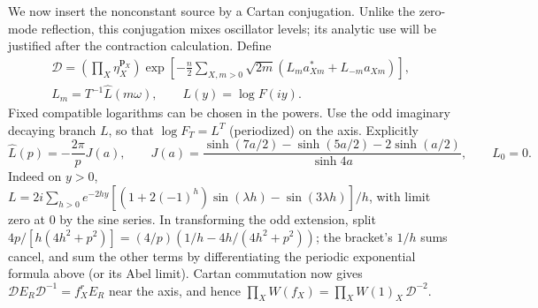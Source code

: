 We now insert the nonconstant source by a Cartan conjugation. Unlike
the zero-mode reflection, this conjugation mixes oscillator levels;
its analytic use will be justified after the contraction calculation.
Define
\[
\begin{gathered}
 \mathcal D=\left(\prod_X\eta_X^{\mathbf p_X}\right)
 \exp\left[-\frac n2\sum_{X,m>0}\sqrt{2m}(L_m a_{Xm}^*+L_{-m} a_{Xm})\right],\\
 L_m=T^{-1}\widehat L(m\omega),\qquad L(y)=\log F(iy).
\end{gathered}
\]
Fixed compatible logarithms can be chosen in the powers. Use the odd imaginary decaying branch \(L\), so that \(\log F_T=L^T\) (periodized) on the axis. Explicitly
\[
 \widehat L(p)=-\frac{2\pi}{p}J(a),\qquad
 J(a)=\frac{\sinh(7a/2)-\sinh(5a/2)-2\sinh(a/2)}{\sinh4a},\qquad L_0=0.
\]
Indeed on \(y>0\), \(L=2i\sum_{h>0}e^{-2hy}[(1+2(-1)^h)\sin(\lambda h)-\sin(3\lambda h)]/h\), with limit zero at 0 by the sine series. In transforming the odd extension, split \(4p/[h(4h^2+p^2)]= (4/p)(1/h-4h/(4h^2+p^2))\); the bracket's \(1/h\) sums cancel, and sum the other terms by differentiating the periodic exponential formula above (or its Abel limit). Cartan commutation now gives \(\mathcal D E_R\mathcal D^{-1}= f_X^r E_R\) near the axis, and hence \(\prod_X W(f_X)=\prod_X W(1)_X\,\mathcal D^{-2}\).

